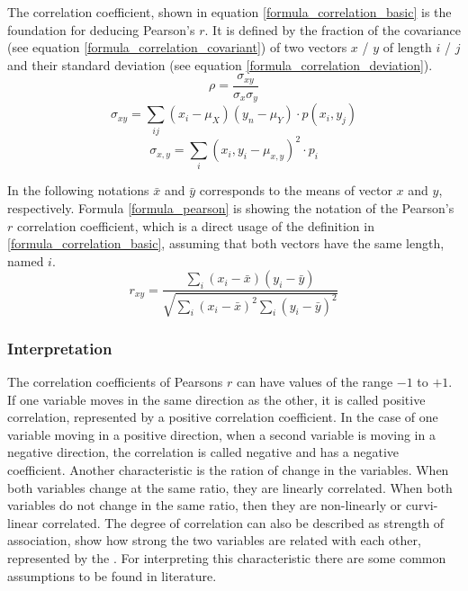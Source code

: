 \documentclass[a4paper,12pt]{report}
\begin{document}
The correlation coefficient, shown in equation \ref{formula_correlation_basic} is the foundation for deducing Pearson's $r$. It is defined by the fraction of the covariance (see equation \ref{formula_correlation_covariant}) of two vectors $x$ / $y$ of length $i$ / $j$ and their standard deviation (see equation \ref{formula_correlation_deviation}). \cite{HerzSchlicherSiegener1992}
\smallskip
\begin{equation}
\label{formula_correlation_basic}
	\rho = \frac{\sigma_{xy}}{\sigma_{x}\sigma_{y}}
\end{equation}
\begin{equation}
\label{formula_correlation_covariant}
	\sigma_{xy} = \sum_{ij}(x_i-\mu_X)(y_n-\mu_Y) \cdot p(x_i,y_j)
\end{equation}
\begin{equation}
\label{formula_correlation_deviation}
	\sigma_{x,y} = \sum_{i}(x_i,y_i-\mu_{x,y})^2 \cdot p_i
\end{equation}

\bigskip

In the following notations $\bar{x}$ and $\bar{y}$ corresponds to the means of vector $x$ and $y$, respectively. Formula \ref{formula_pearson} is showing the notation of the Pearson's $r$ correlation coefficient, which is a direct usage of the definition in \ref{formula_correlation_basic}, assuming that both vectors have the same length, named $i$. 
	\cite{BenestyChenHuang2009,Zychlinski2018}
\smallskip
\begin{equation}
\label{formula_pearson}	
	r_{xy} =  \frac{\sum_{i}{(x_i-\bar{x})(y_i-\bar{y})}}{\sqrt{\sum_{i}{(x_i-\bar{x})^2}\sum_{i}{(y_i-\bar{y})^2}}}
\end{equation}



\subsubsection{Interpretation}

The correlation coefficients of Pearsons $r$ can have values of the range $-1$ to $+1$. If one variable moves in the same direction as the other, it is called positive correlation, represented by a positive correlation coefficient. In the case of one variable moving in a positive direction, when a second variable is moving in a negative direction, the correlation is called negative and has a negative coefficient. Another characteristic is the ration of change in the variables. When both variables change at the same ratio, they are linearly correlated. When both variables do not change in the same ratio, then they are non-linearly or curvi-linear correlated. The degree of correlation can also be described as strength of association, show how strong the two variables are related with each other, represented by the . For interpreting this characteristic there are some common assumptions to be found in literature.
\end{document}
